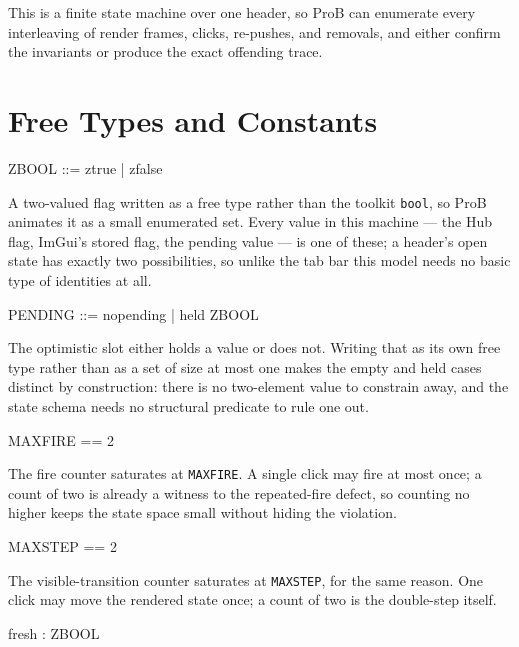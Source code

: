 \documentclass[a4paper,10pt,fleqn]{article}
\begin{document}
This is a finite state machine over one header, so ProB can enumerate every
interleaving of render frames, clicks, re-pushes, and removals, and either
confirm the invariants or produce the exact offending trace.

\section{Free Types and Constants}

\begin{zed}
  ZBOOL ::= ztrue | zfalse
\end{zed}

A two-valued flag written as a free type rather than the toolkit
\texttt{bool}, so ProB animates it as a small enumerated set.  Every value in
this machine --- the Hub flag, ImGui's stored flag, the pending value --- is
one of these; a header's open state has exactly two possibilities, so unlike
the tab bar this model needs no basic type of identities at all.

\begin{zed}
  PENDING ::= nopending | held \ldata ZBOOL \rdata
\end{zed}

The optimistic slot either holds a value or does not.  Writing that as its own
free type rather than as a set of size at most one makes the empty and held
cases distinct by construction: there is no two-element value to constrain
away, and the state schema needs no structural predicate to rule one out.

\begin{zed}
  MAXFIRE == 2
\end{zed}

The fire counter saturates at \texttt{MAXFIRE}.  A single click may fire at
most once; a count of two is already a witness to the repeated-fire defect, so
counting no higher keeps the state space small without hiding the violation.

\begin{zed}
  MAXSTEP == 2
\end{zed}

The visible-transition counter saturates at \texttt{MAXSTEP}, for the same
reason.  One click may move the rendered state once; a count of two is the
double-step itself.

\begin{axdef}
  fresh : ZBOOL
\end{axdef}
\end{document}
